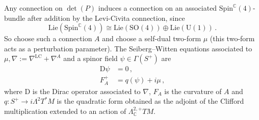    Any connection on $\det(P)$ induces a connection on an associated $\mathrm{Spin}^{\mathbb{C}}(4)$-bundle after addition by the Levi-Civita connection, since \[\mathrm{Lie}(\mathrm{Spin}^{\mathbb{C}}(4))\cong\mathrm{Lie}(\mathrm{SO}(4))\oplus\mathrm{Lie}(\mathrm{U}(1))\,.\] So choose such a connection $A$ and choose a self-dual two-form $\mu$ (this two-form acts as a perturbation parameter). The Seiberg--Witten equations associated to $\mu,\nabla:=\nabla^\mathrm{LC}+\nabla^A$ and a spinor field $\psi\in\Gamma(S^+)$ are
    \begin{align}
        \mathrm{D}\psi &= 0\,,\\
        F_A^+ &= q(\psi) + i\mu\,,\label{unification:sw2}
    \end{align}
    where $\mathrm{D}$ is the Dirac operator associated to $\nabla$, $F_A$ is the curvature of $A$ and $q:S^+\rightarrow i\Lambda^2T^*M$ is the quadratic form obtained as the adjoint of the Clifford multiplication extended to an action of $\Lambda^{2,+}_{\mathbb{C}}TM$.

